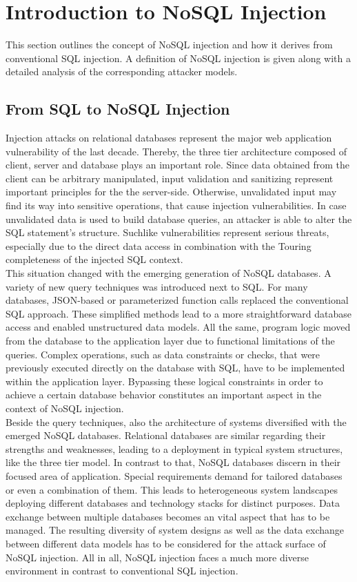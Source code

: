 \chapter{Introduction to NoSQL Injection}
This section outlines the concept of NoSQL injection and how it derives from conventional SQL injection. A definition of NoSQL injection is given along with a detailed analysis of the corresponding attacker models.

\section{From SQL to NoSQL Injection}
Injection attacks on relational databases represent the major web application vulnerability of the last decade. Thereby, the three tier architecture composed of client, server and database plays an important role. Since data obtained from the client can be arbitrary manipulated, input validation and sanitizing represent important principles for the the server-side. Otherwise, unvalidated input may find its way into sensitive operations, that cause injection vulnerabilities. In case unvalidated data is used to build database queries, an attacker is able to alter the SQL statement's structure. Suchlike vulnerabilities represent serious threats, especially due to the direct data access in combination with the Touring completeness of the injected SQL context.\\ 

This situation changed with the emerging generation of NoSQL databases. A variety of new query techniques was introduced next to SQL. For many databases, JSON-based or parameterized function calls replaced the conventional SQL approach. These simplified methods lead to a more straightforward database access and enabled unstructured data models. All the same, program logic moved from the database to the application layer due to functional limitations of the queries. Complex operations, such as data constraints or checks, that were previously executed directly on the database with SQL, have to be implemented within the application layer. Bypassing these logical constraints in order to achieve a certain database behavior constitutes an important aspect in the context of NoSQL injection. \\ 

Beside the query techniques, also the architecture of systems diversified with the emerged NoSQL databases. Relational databases are similar regarding their strengths and weaknesses, leading to a deployment in typical system structures, like the three tier model. In contrast to that, NoSQL databases discern in their focused area of application. Special requirements demand for tailored databases or even a combination of them. This leads to heterogeneous system landscapes deploying different databases and technology stacks for distinct purposes. Data exchange between multiple databases becomes an vital aspect that has to be managed. The resulting diversity of system designs as well as the data exchange between different data models has to be considered for the attack surface of NoSQL injection. All in all, NoSQL injection faces a much more diverse environment in contrast to conventional SQL injection.

